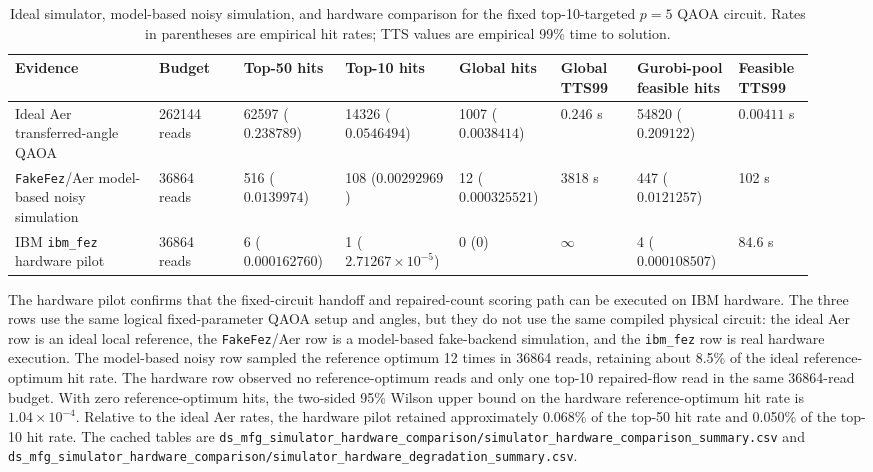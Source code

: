 \begin{table}[t]
\centering
\scriptsize
\setlength{\tabcolsep}{2pt}
\caption{Ideal simulator, model-based noisy simulation, and hardware comparison
for the fixed top-10-targeted $p=5$ QAOA circuit. Rates in parentheses are
empirical hit rates; TTS values are empirical 99\% time to solution.}
\label{tab:ds-mfg-simulator-hardware-comparison}
\begin{tabular}{p{0.17\linewidth}p{0.10\linewidth}p{0.12\linewidth}p{0.12\linewidth}p{0.12\linewidth}p{0.09\linewidth}p{0.12\linewidth}p{0.09\linewidth}}
\hline
Evidence & Budget & Top-50 hits & Top-10 hits & Global hits & Global TTS99 &
Gurobi-pool feasible hits & Feasible TTS99 \\
\hline
Ideal Aer transferred-angle QAOA & 262144 reads &
62597 ($0.238789$) & 14326 ($0.0546494$) & 1007 ($0.0038414$) &
$0.246$ s & 54820 ($0.209122$) & $0.00411$ s \\
\hline
\texttt{FakeFez}/Aer model-based noisy simulation & 36864 reads &
516 ($0.0139974$) & 108 ($0.00292969$) & 12 ($0.000325521$) &
3818 s & 447 ($0.0121257$) & 102 s \\
\hline
IBM \texttt{ibm\_fez} hardware pilot & 36864 reads &
6 ($0.000162760$) & 1 ($2.71267\times 10^{-5}$) & 0 ($0$) &
$\infty$ & 4 ($0.000108507$) & $84.6$ s \\
\hline
\end{tabular}
\end{table}

The hardware pilot confirms that the fixed-circuit handoff and repaired-count
scoring path can be executed on IBM hardware. The three rows use the same
logical fixed-parameter QAOA setup and angles, but they do not use the same
compiled physical circuit: the ideal Aer row is an ideal local reference, the
\texttt{FakeFez}/Aer row is a model-based fake-backend simulation, and the
\texttt{ibm\_fez} row is real hardware execution. The model-based noisy row
sampled the reference optimum 12 times in 36864 reads, retaining about 8.5\% of
the ideal reference-optimum hit rate. The hardware row observed no reference-optimum
reads and only one top-10 repaired-flow read in the same 36864-read budget. With
zero reference-optimum hits, the two-sided 95\% Wilson upper bound on the
hardware reference-optimum hit rate is $1.04\times 10^{-4}$.
Relative to the ideal Aer rates, the hardware pilot retained approximately
0.068\% of the top-50 hit rate and 0.050\% of the top-10 hit rate. The cached
tables are
\texttt{ds\_mfg\_simulator\_hardware\_comparison/simulator\_hardware\_comparison\_summary.csv}
and
\texttt{ds\_mfg\_simulator\_hardware\_comparison/simulator\_hardware\_degradation\_summary.csv}.

